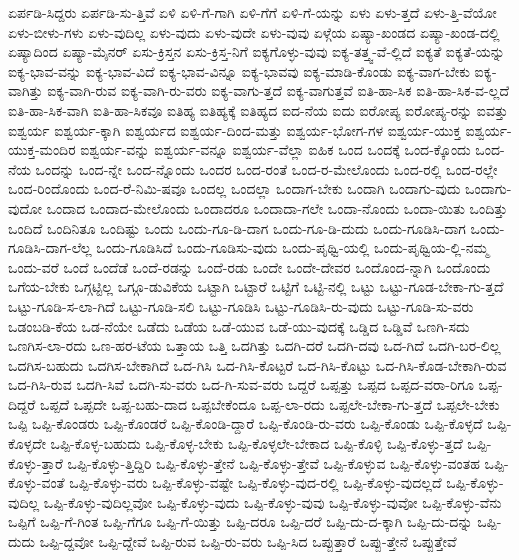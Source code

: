 {ಏರ್ಪಡಿ-ಸಿದ್ದರು
ಏರ್ಪಡಿ-ಸು-ತ್ತಿವೆ
ಏಳಿ
ಏಳಿ-ಗೆ-ಗಾಗಿ
ಏಳಿ-ಗೆಗೆ
ಏಳಿ-ಗೆ-ಯನ್ನು
ಏಳು
ಏಳು-ತ್ತದೆ
ಏಳು-ತ್ತಿ-ವೆಯೋ
ಏಳು-ಬೀಳು-ಗಳು
ಏಳು-ವುದಿಲ್ಲ
ಏಳು-ವುದು
ಏಳು-ವುದೇ
ಏಳು-ವುವು
ಏಳ್ಗೆಯ
ಏಷ್ಯಾ-ಖಂಡದ
ಏಷ್ಯಾ-ಖಂಡ-ದಲ್ಲಿ
ಏಷ್ಯಾದಿಂದ
ಏಷ್ಯಾ-ಮೈನರ್
ಏಸು-ಕ್ರಿಸ್ತನ
ಏಸು-ಕ್ರಿಸ್ತ-ನಿಗೆ
ಐಕ್ಯಗೊಳ್ಳು-ವುವು
ಐಕ್ಯ-ತತ್ತ್ವ-ವೆ-ಲ್ಲಿದೆ
ಐಕ್ಯತೆ
ಐಕ್ಯತೆ-ಯನ್ನು
ಐಕ್ಯ-ಭಾವ-ವನ್ನು
ಐಕ್ಯ-ಭಾವ-ವಿದೆ
ಐಕ್ಯ-ಭಾವ-ವಿನ್ನೂ
ಐಕ್ಯ-ಭಾವವು
ಐಕ್ಯ-ಮಾಡಿ-ಕೊಂಡು
ಐಕ್ಯ-ವಾಗ-ಬೇಕು
ಐಕ್ಯ-ವಾಗಿತ್ತು
ಐಕ್ಯ-ವಾಗಿ-ರುವ
ಐಕ್ಯ-ವಾಗಿ-ರು-ವರು
ಐಕ್ಯ-ವಾಗು-ತ್ತದೆ
ಐಕ್ಯ-ವಾಗುತ್ತವೆ
ಐತಿ-ಹಾ-ಸಿಕ
ಐತಿ-ಹಾ-ಸಿಕ-ವ-ಲ್ಲದೆ
ಐತಿ-ಹಾ-ಸಿಕ-ವಾಗಿ
ಐತಿ-ಹಾ-ಸಿಕವೂ
ಐತಿಹ್ಯ
ಐತಿಹ್ಯಕ್ಕೆ
ಐತಿಹ್ಯದ
ಐದ-ನೆಯ
ಐದು
ಐರೋಪ್ಯ
ಐರೋಪ್ಯ-ರನ್ನು
ಐವತ್ತು
ಐಶ್ವರ್ಯ
ಐಶ್ವರ್ಯ-ಕ್ಕಾಗಿ
ಐಶ್ವರ್ಯದ
ಐಶ್ವರ್ಯ-ದಿಂದ-ಮತ್ತು
ಐಶ್ವರ್ಯ-ಭೋಗ-ಗಳ
ಐಶ್ವರ್ಯ-ಯುಕ್ತ
ಐಶ್ವರ್ಯ-ಯುಕ್ತ-ಮಂದಿರ
ಐಶ್ವರ್ಯ-ವನ್ನು
ಐಶ್ವರ್ಯ-ವನ್ನೂ
ಐಶ್ವರ್ಯ-ವೆಲ್ಲಾ
ಐಹಿಕ
ಒಂದ
ಒಂದಕ್ಕೆ
ಒಂದ-ಕ್ಕೊಂದು
ಒಂದ-ನೆಯ
ಒಂದನ್ನು
ಒಂದ-ನ್ನೇ
ಒಂದ-ನ್ನೊಂದು
ಒಂದರ
ಒಂದ-ರಂತೆ
ಒಂದ-ರ-ಮೇಲೊಂದು
ಒಂದ-ರಲ್ಲಿ
ಒಂದ-ರಲ್ಲೇ
ಒಂದ-ರಿಂದೊಂದು
ಒಂದ-ರೆ-ನಿಮಿ-ಷವೂ
ಒಂದಲ್ಲ
ಒಂದಲ್ಲಾ
ಒಂದಾಗ-ಬೇಕು
ಒಂದಾಗಿ
ಒಂದಾಗು-ವುದು
ಒಂದಾಗು-ವುದೋ
ಒಂದಾದ
ಒಂದಾದ-ಮೇಲೊಂದು
ಒಂದಾದರೂ
ಒಂದಾದಾ-ಗಲೇ
ಒಂದಾ-ನೊಂದು
ಒಂದಾ-ಯಿತು
ಒಂದಿತ್ತು
ಒಂದಿದೆ
ಒಂದಿನಿತೂ
ಒಂದಿಷ್ಟು
ಒಂದು
ಒಂದು-ಗೂ-ಡಿ-ದಾಗ
ಒಂದು-ಗೂ-ಡಿ-ದುದು
ಒಂದು-ಗೂಡಿಸಿ-ದಾಗ
ಒಂದು-ಗೂಡಿಸಿ-ದಾಗ-ಲೆಲ್ಲ
ಒಂದು-ಗೂಡಿಸಿದೆ
ಒಂದು-ಗೂಡಿಸು-ವುದು
ಒಂದು-ಪೃಥ್ವಿ-ಯಲ್ಲಿ
ಒಂದು-ಪೃಥ್ವಿಯ-ಲ್ಲಿ-ನಮ್ಮ
ಒಂದು-ವರೆ
ಒಂದೆ
ಒಂದೆಡೆ
ಒಂದೆ-ರಡನ್ನು
ಒಂದೆ-ರಡು
ಒಂದೇ
ಒಂದೇ-ದೇವರ
ಒಂದೊಂದ-ನ್ನಾಗಿ
ಒಂದೊಂದು
ಒಗೆಯ-ಬೇಕು
ಒಗ್ಗಟ್ಟಿಲ್ಲ
ಒಗ್ಗೂ-ಡುವಿಕೆಯ
ಒಟ್ಟಾಗಿ
ಒಟ್ಟಾರೆ
ಒಟ್ಟಿಗೆ
ಒಟ್ಟಿ-ನಲ್ಲಿ
ಒಟ್ಟು
ಒಟ್ಟು-ಗೂಡ-ಬೇಕಾ-ಗು-ತ್ತದೆ
ಒಟ್ಟು-ಗೂಡಿ-ಸ-ಲಾ-ಗಿದೆ
ಒಟ್ಟು-ಗೂಡಿ-ಸಲಿ
ಒಟ್ಟು-ಗೂಡಿಸಿ
ಒಟ್ಟು-ಗೂಡಿಸಿ-ರು-ವುದು
ಒಟ್ಟು-ಗೂಡಿ-ಸು-ವರು
ಒಡಂಬಡಿ-ಕೆಯ
ಒಡ-ನೆಯೇ
ಒಡೆದು
ಒಡೆಯ
ಒಡೆ-ಯುವ
ಒಡೆ-ಯು-ವುದಕ್ಕೆ
ಒಡ್ಡಿದ
ಒಡ್ಡಿವೆ
ಒಣಗಿ-ಸದು
ಒಣಗಿಸ-ಲಾ-ರದು
ಒಣ-ಹರ-ಟೆಯ
ಒತ್ತಾಯ
ಒತ್ತಿ
ಒದಗಿತ್ತು
ಒದಗಿ-ದರೆ
ಒದಗಿ-ದವು
ಒದ-ಗಿದೆ
ಒದಗಿ-ಬರ-ಲಿಲ್ಲ
ಒದಗಿಸ-ಬಹುದು
ಒದಗಿಸ-ಬೇಕಾಗಿದೆ
ಒದ-ಗಿಸಿ
ಒದ-ಗಿಸಿ-ಕೊಟ್ಟರೆ
ಒದ-ಗಿಸಿ-ಕೊಟ್ಟು
ಒದ-ಗಿಸಿ-ಕೊಡ-ಬೇಕಾಗಿ-ರುವ
ಒದ-ಗಿಸಿ-ರುವ
ಒದಗಿ-ಸಿವೆ
ಒದಗಿ-ಸು-ವರು
ಒದ-ಗಿ-ಸುವ-ವರು
ಒದ್ದರೆ
ಒಪ್ಪತ್ತು
ಒಪ್ಪದ
ಒಪ್ಪದ-ವರಾ-ರಿಗೂ
ಒಪ್ಪ-ದಿದ್ದರೆ
ಒಪ್ಪದೆ
ಒಪ್ಪದೇ
ಒಪ್ಪ-ಬಹು-ದಾದ
ಒಪ್ಪಬೇಕೆಂದೂ
ಒಪ್ಪ-ಲಾ-ರದು
ಒಪ್ಪಲೇ-ಬೇಕಾ-ಗು-ತ್ತದೆ
ಒಪ್ಪಲೇ-ಬೇಕು
ಒಪ್ಪಿ
ಒಪ್ಪಿ-ಕೊಂಡರು
ಒಪ್ಪಿ-ಕೊಂಡರೆ
ಒಪ್ಪಿ-ಕೊಂಡಿ-ದ್ದಾರೆ
ಒಪ್ಪಿ-ಕೊಂಡಿ-ರು-ವರು
ಒಪ್ಪಿ-ಕೊಂಡು
ಒಪ್ಪಿ-ಕೊಳ್ಳದೆ
ಒಪ್ಪಿ-ಕೊಳ್ಳದೇ
ಒಪ್ಪಿ-ಕೊಳ್ಳ-ಬಹುದು
ಒಪ್ಪಿ-ಕೊಳ್ಳ-ಬೇಕು
ಒಪ್ಪಿ-ಕೊಳ್ಳಲೇ-ಬೇಕಾದ
ಒಪ್ಪಿ-ಕೊಳ್ಳಿ
ಒಪ್ಪಿ-ಕೊಳ್ಳು-ತ್ತದೆ
ಒಪ್ಪಿ-ಕೊಳ್ಳು-ತ್ತಾರೆ
ಒಪ್ಪಿ-ಕೊಳ್ಳು-ತ್ತಿದ್ದಿರಿ
ಒಪ್ಪಿ-ಕೊಳ್ಳು-ತ್ತೇನೆ
ಒಪ್ಪಿ-ಕೊಳ್ಳು-ತ್ತೇವೆ
ಒಪ್ಪಿ-ಕೊಳ್ಳುವ
ಒಪ್ಪಿ-ಕೊಳ್ಳು-ವಂತಹ
ಒಪ್ಪಿ-ಕೊಳ್ಳು-ವಂತೆ
ಒಪ್ಪಿ-ಕೊಳ್ಳು-ವರು
ಒಪ್ಪಿ-ಕೊಳ್ಳು-ವಷ್ಟೇ
ಒಪ್ಪಿ-ಕೊಳ್ಳು-ವುದ-ರಲ್ಲಿ
ಒಪ್ಪಿ-ಕೊಳ್ಳು-ವುದಲ್ಲದೆ
ಒಪ್ಪಿ-ಕೊಳ್ಳು-ವುದಿಲ್ಲ
ಒಪ್ಪಿ-ಕೊಳ್ಳು-ವುದಿಲ್ಲವೋ
ಒಪ್ಪಿ-ಕೊಳ್ಳು-ವುದು
ಒಪ್ಪಿ-ಕೊಳ್ಳು-ವುವು
ಒಪ್ಪಿ-ಕೊಳ್ಳು-ವುವೋ
ಒಪ್ಪಿ-ಕೊಳ್ಳು-ವೆನು
ಒಪ್ಪಿಗೆ
ಒಪ್ಪಿ-ಗೆ-ಗಿಂತ
ಒಪ್ಪಿ-ಗೆಗೂ
ಒಪ್ಪಿ-ಗೆ-ಯಿತ್ತು
ಒಪ್ಪಿ-ದರೂ
ಒಪ್ಪಿ-ದರೆ
ಒಪ್ಪಿ-ದು-ದ-ಕ್ಕಾಗಿ
ಒಪ್ಪಿ-ದು-ದನ್ನು
ಒಪ್ಪಿ-ದುದು
ಒಪ್ಪಿ-ದ್ದವೋ
ಒಪ್ಪಿ-ದ್ದೇವೆ
ಒಪ್ಪಿ-ರುವ
ಒಪ್ಪಿ-ರು-ವರು
ಒಪ್ಪಿ-ಸಿದ
ಒಪ್ಪುತ್ತಾರೆ
ಒಪ್ಪು-ತ್ತೇನೆ
ಒಪ್ಪುತ್ತೇವೆ
}

